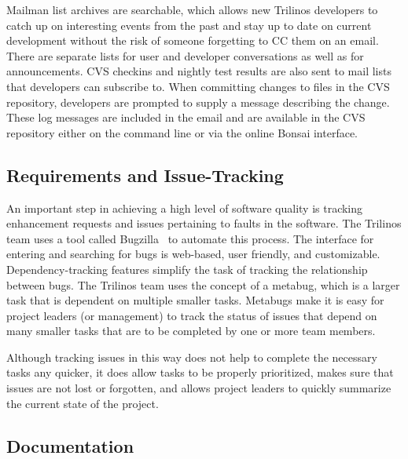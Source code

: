 \documentclass[times,10pt,twocolumn]{article}
\begin{document}
Mailman list archives are  searchable, which allows new Trilinos
developers to catch up on interesting events from the past and stay
up to date on current development without the risk of someone
forgetting to CC them on an email. There are separate lists for user
and developer conversations as well as for announcements. CVS
checkins and nightly test results are also sent to mail lists that
developers can subscribe to.  When committing changes to files in
the CVS repository, developers are prompted to supply a message
describing the change.  These log messages are included in the email
and are available in the CVS repository either on the command line
or via the online Bonsai interface.

\subsection{Requirements and Issue-Tracking}


An important step in achieving a high level of software quality is
tracking enhancement requests and issues pertaining to faults in the
software.  The Trilinos team uses a tool called
Bugzilla~\cite{Bugzilla} to automate this process.  The interface
for entering and searching for bugs is web-based, user friendly, and
customizable.  Dependency-tracking features simplify the task of
tracking the relationship between bugs.  The Trilinos team uses the
concept of a metabug, which is a larger task that is dependent on
multiple smaller tasks. Metabugs make it is easy for project leaders
(or management) to track the status of issues that depend on many
smaller tasks that are to be completed by one or more team members.

Although tracking issues in this way does not help to complete the
necessary tasks any quicker, it does allow tasks to be properly
prioritized, makes sure that issues are not lost or forgotten, and
allows project leaders to quickly summarize the current state of the
project.

\subsection{Documentation}

\end{document}
